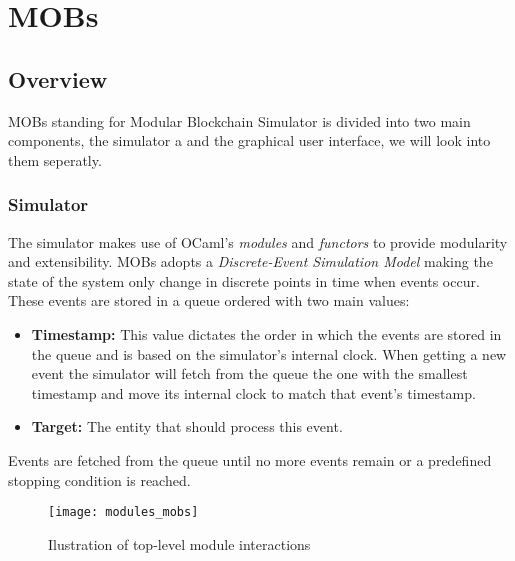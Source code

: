 
%

\chapter{MOBs}
\label{cha:mobs}

\section{Overview}
\label{sub:overview}

MOBs standing for Modular Blockchain Simulator is divided into two main components,
the simulator a and the graphical user interface, we will look into them seperatly.

\subsection{Simulator}
\label{subsec:simulator}

The simulator makes use of OCaml's \textit{modules} and \textit{functors} to
provide modularity and extensibility. MOBs adopts a \textit{Discrete-Event Simulation Model}
making the state of the system only change in discrete points in time when events occur.
These events are stored in a queue ordered with two main values:
\begin{itemize}
  \item \textbf{Timestamp:} This value dictates the order in which the events are
stored in the queue and is based on the simulator's internal clock. When getting
a new event the simulator will fetch from the queue the one with the smallest timestamp
and move its internal clock to match that event's timestamp.
  \item \textbf{Target:} The entity that should process this event.
\end{itemize}
Events are fetched from the queue until no more events remain or a predefined
stopping condition is reached.

\begin{figure}[h]
	\centering
	\texttt{[image: modules\_mobs]}
	\caption{Ilustration of top-level module interactions}
	\label{fig:modules_mobs}
\end{figure}

